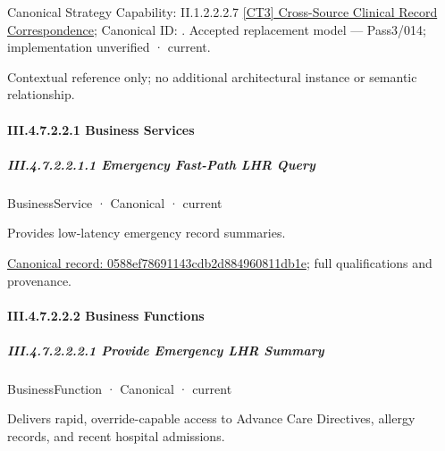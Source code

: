 {\small Canonical Strategy Capability: II.1.2.2.2.7 \hyperref[element:08c8d56f6a1c45b4919e9579b3f695a0]{[CT3] Cross-Source Clinical Record Correspondence}; Canonical ID: \texttt{}. Accepted replacement model — Pass3/014; implementation unverified · current.}\par
Contextual reference only; no additional architectural instance or semantic relationship.\par
\paragraph*{III.4.7.2.2.1 Business Services}
\label{navigation:III.4.7.2.2.1}

\subparagraph*{III.4.7.2.2.1.1 Emergency Fast-Path LHR Query}
\label{navigation:III.4.7.2.2.1.1}

\label{element:0588ef78691143cdb2d884960811db1e}
{\small BusinessService · Canonical · current}\par

Provides low-latency emergency record summaries.


{\footnotesize \href{../../../../continuum/business/business-service/0588ef78691143cdb2d884960811db1e.md}{Canonical record: 0588ef78691143cdb2d884960811db1e}; full qualifications and provenance.}\par
\paragraph*{III.4.7.2.2.2 Business Functions}
\label{navigation:III.4.7.2.2.2}

\subparagraph*{III.4.7.2.2.2.1 Provide Emergency LHR Summary}
\label{navigation:III.4.7.2.2.2.1}

\label{element:a7235e8b249a4914b951e0d795132316}
{\small BusinessFunction · Canonical · current}\par

Delivers rapid, override-capable access to Advance Care Directives, allergy records, and recent hospital admissions.


